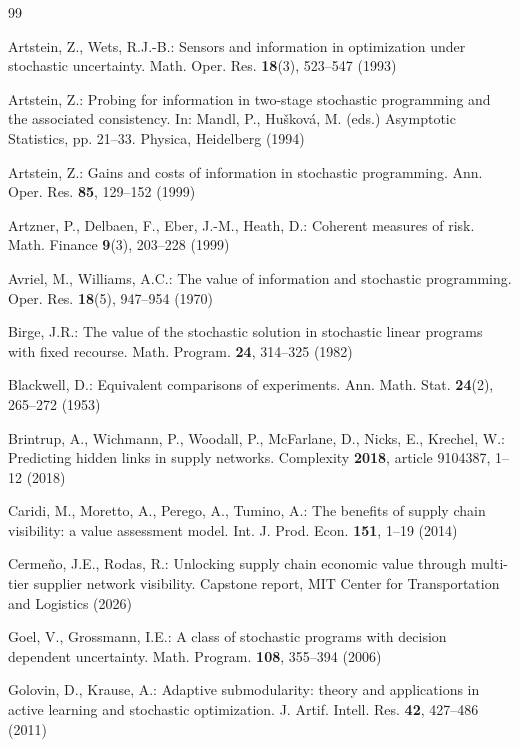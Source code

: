 \documentclass[pdflatex,sn-mathphys-num]{sn-jnl}
\theoremstyle{thmstyleone}
\theoremstyle{thmstyletwo}
\theoremstyle{thmstylethree}
\begin{document}
\begin{thebibliography}{99}

Artstein, Z., Wets, R.J.-B.: Sensors and information in optimization under
stochastic uncertainty. Math. Oper. Res. \textbf{18}(3), 523--547 (1993)

Artstein, Z.: Probing for information in two-stage stochastic programming and
the associated consistency. In: Mandl, P., Hu\v{s}kov\'a, M. (eds.)
Asymptotic Statistics, pp. 21--33. Physica, Heidelberg (1994)

Artstein, Z.: Gains and costs of information in stochastic programming.
Ann. Oper. Res. \textbf{85}, 129--152 (1999)

Artzner, P., Delbaen, F., Eber, J.-M., Heath, D.: Coherent measures of risk.
Math. Finance \textbf{9}(3), 203--228 (1999)

Avriel, M., Williams, A.C.: The value of information and stochastic
programming. Oper. Res. \textbf{18}(5), 947--954 (1970)

Birge, J.R.: The value of the stochastic solution in stochastic linear
programs with fixed recourse. Math. Program. \textbf{24}, 314--325 (1982)

Blackwell, D.: Equivalent comparisons of experiments. Ann. Math. Stat.
\textbf{24}(2), 265--272 (1953)

Brintrup, A., Wichmann, P., Woodall, P., McFarlane, D., Nicks, E., Krechel,
W.: Predicting hidden links in supply networks. Complexity \textbf{2018},
article 9104387, 1--12 (2018)

Caridi, M., Moretto, A., Perego, A., Tumino, A.: The benefits of supply
chain visibility: a value assessment model. Int. J. Prod. Econ.
\textbf{151}, 1--19 (2014)

Cerme\~{n}o, J.E., Rodas, R.: Unlocking supply chain economic value through
multi-tier supplier network visibility. Capstone report, MIT Center for
Transportation and Logistics (2026)

Goel, V., Grossmann, I.E.: A class of stochastic programs with decision
dependent uncertainty. Math. Program. \textbf{108}, 355--394 (2006)

Golovin, D., Krause, A.: Adaptive submodularity: theory and applications in
active learning and stochastic optimization. J. Artif. Intell. Res.
\textbf{42}, 427--486 (2011)


\end{thebibliography}
\end{document}
